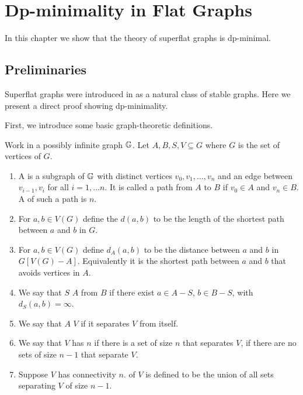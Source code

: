 \chapter{Dp-minimality in Flat Graphs}

In this chapter we show that the theory of superflat graphs is dp-minimal.

\section{Preliminaries}

Superflat graphs were introduced in \cite{stable_graphs} as a natural class of stable graphs. Here we present a direct proof showing dp-minimality.

First, we introduce some basic graph-theoretic definitions.
\begin{Definition}
  Work in a possibly infinite graph $\mathbb G$. Let $A, B, S, V \subseteq G$ where $G$ is the set of vertices of $G$.
  \begin{enumerate}
  \item A  is a subgraph of $\mathbb G$ with distinct vertices $v_0, v_1, \ldots, v_n$ and an edge between $v_{i-1}, v_i$ for all $i = 1, \ldots n$.
    It is called a path from $A$ to $B$ if $v_0 \in A$ and $v_n \in B$.
    A  of such a path is $n$.
  \item For $a,b \in V(G)$ define the  $d(a,b)$ to be the length of the shortest path between $a$ and $b$ in $G$.
  \item For $a,b \in V(G)$ define $d_A(a,b)$ to be the distance between $a$ and $b$ in $G[V(G) - A]$. Equivalently it is the shortest path between $a$ and $b$ that avoids vertices in $A$.
  \item We say that $S$  $A$ from $B$ if there exist $a \in A - S$, $b \in B - S$, with $d_S(a,b) = \infty$.
  \item We say that $A$  $V$ if it separates $V$ from itself.
  \item We say that $V$ has  $n$ if there is a set of size $n$ that separates $V$,
    if there are no sets of size $n-1$ that separate $V$.
  \item Suppose $V$ has connectivity $n$.  of $V$ is defined to be the union of all sets separating $V$ of size $n-1$.
  \end{enumerate}
\end{Definition}

